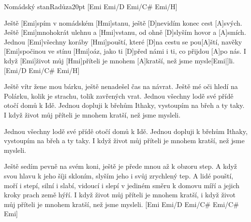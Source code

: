 \begin{song}{Nomádský stan}{Radůza}{20pt}
[Emi Emi/D Emi/C# Emi/H]{}

%
Ještě [Emi]spím v nomádském [Hmi]stanu, ještě [D]nevidím konec cest [A]svých.
Ještě [Emi]mnohokrát ulehnu a [Hmi]vstanu, od ohně [D]slyším hovor a [A]smích.
Jednou [Emi]všechny koráby [Hmi]pouští, které [D]na cestu se pou[A]{ští},
navěky [Emi]spočinou ve stínu [Hmi]oáz, jako ti [D]před námi i ti, co přijdou [A]po nás.
I když [Emi]{ži}vot můj [Hmi]příteli je mnohem [A]kratší,
než jsme mysle[Emi|]{li.} [Emi/D Emi/C# Emi/H]{}

%
Ještě vítr žene mou bárku, ještě nenadešel čas na návrat.
Ještě mé oči hledí na Polárku, kolik je strachu, tolik zavřených vrat.
Jednou všechny lodě své přídě otočí domů k Idě.
Jednou dopluji k břehům Ithaky, vystoupím na břeh a ty taky.
I když život můj příteli je mnohem kratší,
než jsme mysleli.

\verse{*}%
Jednou všechny lodě své přídě otočí domů k Idě.
Jednou dopluji k břehům Ithaky, vystoupím na břeh a ty taky.
I když život můj příteli je mnohem kratší,
než jsme mysleli.

%
Ještě sedím pevně na svém koni, ještě je přede mnou až k obzoru step.
A když svou hlavu k jeho šíji skloním, slyším jeho i svůj zrychlený tep.
A lidé pouští, moří i stepí, silní i slabí, vidoucí i slepí
v jediném směru k domovu míří a jejich kroky prach země hýří.
I když život můj příteli je mnohem kratší,
i když život můj příteli je mnohem kratší,
než jsme mysleli.
[Emi Emi/D Emi/C# Emi/C# Emi]{}


\end{song}
